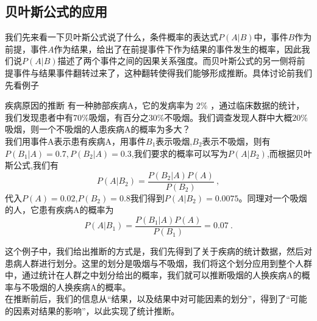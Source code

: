 \subsection{贝叶斯公式的应用}
我们先来看一下贝叶斯公式说了什么，条件概率的表达式$P(A|B)$中，事件$B$作为前提，事件$A$作为结果，给出了在前提事件下作为结果的事件发生的概率，因此我们说$P(A|B)$描述了两个事件之间的因果关系强度。而贝叶斯公式的另一侧将前提事件与结果事件翻转过来了，这种翻转使得我们能够形成推断。具体讨论前我们先看例子
\begin{example}{疾病原因的推断}
有一种肺部疾病A，它的发病率为 $2 \%$ ，通过临床数据的统计，我们发现患者中有$70\%$吸烟，有百分之$30\%$不吸烟。我们调查发现人群中大概$20\%$吸烟，则一个不吸烟的人患疾病A的概率为多大？\\
我们用事件A表示患有疾病A，用事件$B_1$表示吸烟,$B_2$表示不吸烟，则有$P(B_1|A) = 0.7,P(B_2|A)=0.3$,我们要求的概率可以写为$P(A|B_2)$,而根据贝叶斯公式,我们有
\begin{equation}
P(A|B_2) = \frac{P(B_2|A) P(A)}{P(B_2)}~,
\end{equation}
代入$P(A)=0.02$,$P(B_2)=0.8$我们得到$P(A|B_2) = 0.0075$。同理对一个吸烟的人，它患有疾病A的概率为
\begin{equation}
P(A|B_1) = \frac{P(B_1|A) P(A)}{P(B_1)} = 0.07~.
\end{equation}
\end{example}
这个例子中，我们给出推断的方式是，我们先得到了关于疾病的统计数据，然后对患病人群进行划分。这里的划分是吸烟与不吸烟，我们将这个划分应用到整个人群中，通过统计在人群之中划分给出的概率，我们就可以推断吸烟的人换疾病A的概率与不吸烟的人换疾病A的概率。\\
在推断前后，我们的信息从“结果，以及结果中对可能因素的划分”，得到了“可能的因素对结果的影响”，以此实现了统计推断。
